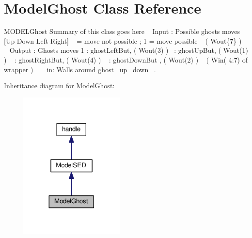 \hypertarget{class_model_ghost}{}\section{Model\+Ghost Class Reference}
\label{class_model_ghost}


M\+O\+D\+E\+L\+Ghost Summary of this class goes here ~\newline
 Input \+: Possible ghost\textquotesingle{}s moves \mbox{[}Up Down Left Right\mbox{]} ~ = move not possible ; 1 = move possible ~\newline
 ( Wout\{7\} ) ~\newline
~\newline
 Output \+: Ghost\textquotesingle{}s moves 1 \+: ghost\+Left\+But, ( Wout(3) )~ \+: ghost\+Up\+But, ( Wout(1) ) ~ \+: ghost\+Right\+But, ( Wout(4) ) ~ \+: ghost\+Down\+But , ( Wout(2) ) ~\newline
 ( Win( 4\+:7) of wrapper ) ~\newline
~\newline
 in\+: Walls around ghost~ up~ down~\newline
.  




Inheritance diagram for Model\+Ghost\+:
\nopagebreak
\begin{figure}[H]
\begin{center}
\leavevmode
\includegraphics[width=149pt]{class_model_ghost__inherit__graph}
\end{center}
\end{figure}
